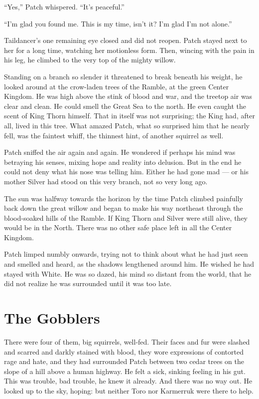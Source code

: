 \documentclass[ebook,oneside,openany,12pt]{memoir}
\begin{document}
“Yes,” Patch whispered. “It’s peaceful.”

“I’m glad you found me. This is my time, isn’t it? I’m glad I’m not
alone.”

Taildancer’s one remaining eye closed and did not reopen. Patch stayed
next to her for a long time, watching her motionless form. Then,
wincing with the pain in his leg, he climbed to the very top of the
mighty willow.

Standing on a branch so slender it threatened to break beneath his
weight, he looked around at the crow-laden trees of the Ramble, at the
green Center Kingdom. He was high above the stink of blood and war,
and the treetop air was clear and clean. He could smell the Great Sea
to the north. He even caught the scent of King Thorn himself. That in
itself was not surprising; the King had, after all, lived in this
tree. What amazed Patch, what so surprised him that he nearly fell,
was the faintest whiff, the thinnest hint, of another squirrel as
well.

Patch sniffed the air again and again. He wondered if perhaps his mind
was betraying his senses, mixing hope and reality into delusion. But
in the end he could not deny what his nose was telling him. Either he
had gone mad — or his mother Silver had stood on this very branch, not
so very long ago.

The sun was halfway towards the horizon by the time Patch climbed
painfully back down the great willow and began to make his way
northeast through the blood-soaked hills of the Ramble. If King Thorn
and Silver were still alive, they would be in the North. There was no
other safe place left in all the Center Kingdom.

Patch limped numbly onwards, trying not to think about what he had
just seen and smelled and heard, as the shadows lengthened around
him. He wished he had stayed with White. He was so dazed, his mind so
distant from the world, that he did not realize he was surrounded
until it was too late.


\section{The Gobblers}

There were four of them, big squirrels, well-fed. Their faces and fur
were slashed and scarred and darkly stained with blood, they wore
expressions of contorted rage and hate, and they had surrounded Patch
between two cedar trees on the slope of a hill above a human
highway. He felt a sick, sinking feeling in his gut. This was trouble,
bad trouble, he knew it already. And there was no way out. He looked
up to the sky, hoping: but neither Toro nor Karmerruk were there to
help.
\end{document}
